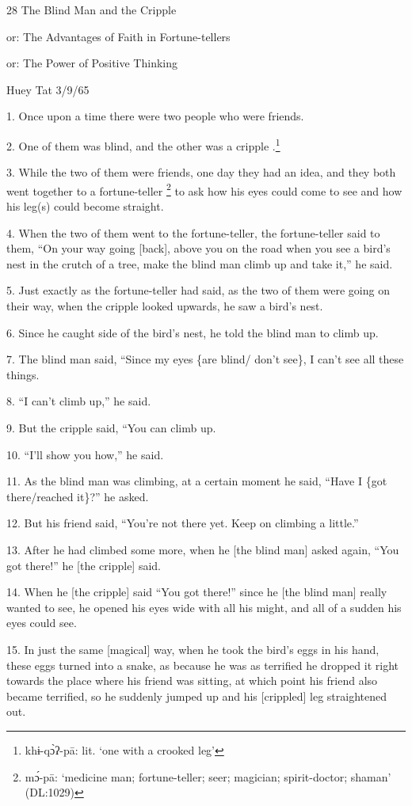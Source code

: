 
28 The Blind Man and the Cripple

or: The Advantages of Faith in Fortune-tellers

or: The Power of Positive Thinking

Huey Tat 3/9/65

1. Once upon a time there were two people who were friends.

2. One of them was blind, and the other was a cripple .\footnote{khɨ-qɔ̀ʔ-pā: lit. `one with a crooked leg'}

3. While the two of them were friends, one day they had an idea, and they both
went together to a fortune-teller \footnote{mɔ́-pā: `medicine man; fortune-teller; seer; magician; spirit-doctor; shaman' (DL:1029)} to ask how his eyes could come to see and
how his leg(s) could become straight.

4. When the two of them went to the fortune-teller, the fortune-teller said to
them, ``On your way going [back], above you on the road when you see a bird's nest
in the crutch of a tree, make the blind man climb up and take it,'' he said.

5. Just exactly as the fortune-teller had said, as the two of them were going on
their way, when the cripple looked upwards, he saw a bird's nest.

6. Since he caught side of the bird's nest, he told the blind man to climb up.

7. The blind man said, ``Since my eyes \{are blind/ don't see\}, I can't see all
these things.

8. ``I can't climb up,'' he said.

9. But the cripple said, ``You can climb up.

10. ``I'll show you how,'' he said.

11. As the blind man was climbing, at a certain moment he said, ``Have I \{got
there/reached it\}?'' he asked.

12. But his friend said, ``You're not there yet.  Keep on climbing a little.''

13. After he had climbed some more, when he [the blind man] asked again, ``You
got there!'' he [the cripple] said.

14. When he [the cripple] said ``You got there!'' since he [the blind man] really
wanted to see, he opened his eyes wide with all his might, and all of a sudden
his eyes could see.

15. In just the same [magical] way, when he took the bird's eggs in his hand, these
eggs turned into a snake, as because he was as terrified he dropped it right towards
the place where his friend was sitting, at which point his friend also became terrified,
so he suddenly jumped up and his [crippled] leg straightened out.

